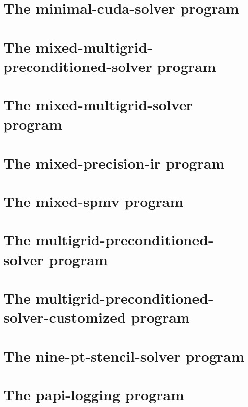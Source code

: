 \let\mypdfximage\pdfximage\def\pdfximage{\immediate\mypdfximage}\documentclass[twoside]{book}
\newcommand{\+}{\discretionary{\mbox{\scriptsize$\hookleftarrow$}}{}{}}
\begin{document}
\chapter{The minimal-\/cuda-\/solver program}
\label{minimal_cuda_solver}

\chapter{The mixed-\/multigrid-\/preconditioned-\/solver program}
\label{mixed_multigrid_preconditioned_solver}

\chapter{The mixed-\/multigrid-\/solver program}
\label{mixed_multigrid_solver}

\chapter{The mixed-\/precision-\/ir program}
\label{mixed_precision_ir}

\chapter{The mixed-\/spmv program}
\label{mixed_spmv}

\chapter{The multigrid-\/preconditioned-\/solver program}
\label{multigrid_preconditioned_solver}

\chapter{The multigrid-\/preconditioned-\/solver-\/customized program}
\label{multigrid_preconditioned_solver_customized}

\chapter{The nine-\/pt-\/stencil-\/solver program}
\label{nine_pt_stencil_solver}

\chapter{The papi-\/logging program}
\label{papi_logging}

\end{document}
